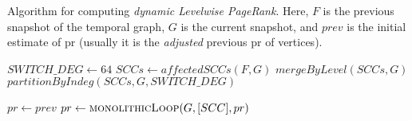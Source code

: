 \vspace{2em}
\begin{algorithm}[!hbtp]
\caption{Algorithm for computing \emph{dynamic Levelwise PageRank}. Here, $F$ is the previous snapshot of the temporal graph, $G$ is the current snapshot, and $prev$ is the initial estimate of pr (usually it is the \emph{adjusted} previous pr of vertices).}
\label{alg:pr-levelwise}
\begin{algorithmic}
  \State $SWITCH\_DEG \gets 64$ 
  \State $SCCs \gets affectedSCCs(F, G)$
  \State $mergeByLevel(SCCs, G)$
    \State $partitionByIndeg(SCCs, G, SWITCH\_DEG)$
  \EndIf
\EndFunction

\Statex

  \State $pr \gets prev$
    \State $pr \gets \textsc{monolithicLoop}(G, [SCC], pr)$ \\  
  \EndFor
\EndFunction
\end{algorithmic}
\end{algorithm}
\vspace{1em}